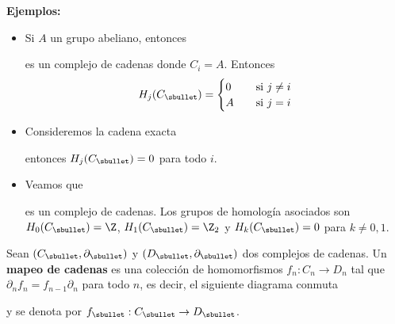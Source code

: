 \documentclass{article}
\begin{document}
\vspace{2mm}
\noindent\textbf{Ejemplos:}
\begin{itemize}
    \item Si $A$ un grupo abeliano, entonces
    
    \vspace{2mm}
    \centerline{
    }
    \vspace{2mm}
    es un complejo de cadenas donde $C_{i}=A$. Entonces
    \begin{equation*}
        H_{j}(C_{\sbullet})=\begin{cases}
            0 & \quad\text{si }j\neq i \\
            A & \quad\text{si }j=i
        \end{cases}
    \end{equation*}

    \item Consideremos la cadena exacta
    
    \vspace{2mm}
    \centerline{
    }
    \vspace{2mm}
    entonces $H_{j}(C_{\sbullet})=0$ para todo $i$.

    \item Veamos que
    
    \vspace{2mm}
    \centerline{
    }
    \vspace{2mm}    
    es un complejo de cadenas. Los grupos de homología asociados son $H_{0}(C_{\sbullet})=\Z$, 
    $H_{1}(C_{\sbullet})=\Z_{2}$ y $H_{k}(C_{\sbullet})=0$ para $k\neq0,1$.
\end{itemize}

\begin{dfn}
    Sean $(C_{\sbullet},\partial_{\sbullet})$ y $(D_{\sbullet},\partial_{\sbullet})$ dos complejos 
    de cadenas. Un \textbf{mapeo de cadenas} es una colección de homomorfismos 
    $f_{n}:C_{n}\to D_{n}$ tal que $\partial_{n}f_{n}=f_{n-1}\partial_{n}$ para todo $n$, es 
    decir, el siguiente diagrama conmuta

    \vspace{2mm}
    \centerline{
    }
    \noindent y se denota por $f_{\sbullet}:C_{\sbullet}\to D_{\sbullet}$.
\end{dfn}
\end{document}
